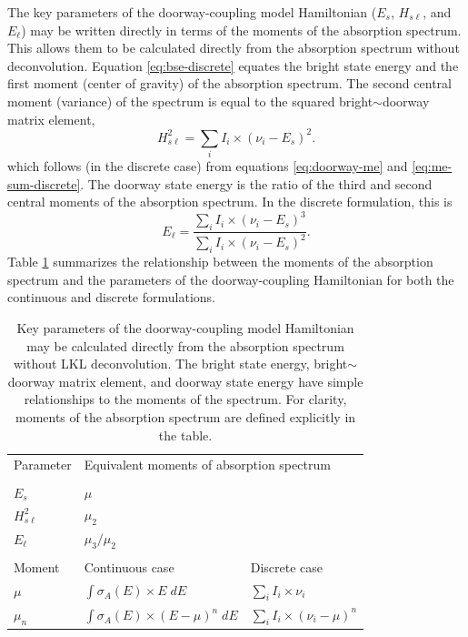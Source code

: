 \documentclass[12pt]{mitthesis}
\begin{document}
The key parameters of the doorway-coupling model Hamiltonian ($E_s$,
$H_{s\ell}$, and $E_{\ell}$) may be written directly in terms of the
moments of the absorption spectrum.  This allows them to be calculated
directly from the absorption spectrum without deconvolution.  Equation
\ref{eq:bse-discrete} equates the bright state energy and the first
moment (center of gravity) of the absorption spectrum.  The second
central moment (variance) of the spectrum is equal to the squared
bright$\sim$doorway matrix element,
\begin{equation}
  \label{eq:doorway-moment}
  H_{s\ell}^2 = \sum_i I_i \times (\nu_i - E_s)^2.
\end{equation}
which follows (in the discrete case) from equations
\ref{eq:doorway-me} and \ref{eq:me-sum-discrete}.  The doorway state
energy is the ratio of the third and second central moments of the
absorption spectrum.  In the discrete formulation, this is
\begin{equation}
  E_{\ell} = \frac{{\displaystyle \sum_i I_i \times (\nu_i - E_s)^3}}
                {{\displaystyle \sum_i I_i \times (\nu_i - E_s)^2}}.
\end{equation}
Table \ref{table:moments} summarizes the relationship between the
moments of the absorption spectrum and the parameters of the
doorway-coupling Hamiltonian for both the continuous and discrete
formulations.

\begin{table}
  \caption{Key parameters of the doorway-coupling model Hamiltonian 
    may be calculated directly from the absorption spectrum without 
    LKL deconvolution.  The bright state energy, bright$\sim$doorway
    matrix element, and doorway state energy have simple relationships
    to the moments of the spectrum.  For clarity, moments of the
    absorption spectrum are defined explicitly in the table.}
  \label{table:moments}
  \centering
  \begin{tabular}{lll}
    & \\
    \toprule
    Parameter & \multicolumn{2}{l}{Equivalent moments of absorption spectrum} \\
    \midrule
    & \\
    $E_s$ & $\mu$ \\
    $H_{s\ell}^2$ & $\mu_2$ \\
    $E_{\ell}$ & $\mu_3 / \mu_2$ \\
    & \\
    \toprule
    Moment & Continuous case & Discrete case \\
    \midrule
    $\mu$ 
      & ${\displaystyle \int \sigma_A(E) \times E \; dE}$ 
      & ${\displaystyle \sum_i I_i \times \nu_i}$ \\
    $\mu_n$ 
      & ${\displaystyle \int \sigma_A(E) \times (E - \mu)^n \; dE}$
      & ${\displaystyle \sum_i I_i \times (\nu_i - \mu)^n}$ \\
      \bottomrule
  \end{tabular}
\end{table}
\end{document}
